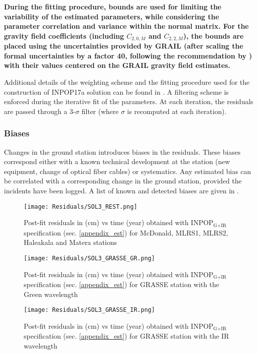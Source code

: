 \documentclass[fleqn,usenatbib,referee]{mnras}
\begin{document}
    \textbf{During the fitting procedure, bounds are used \cite[]{Stark&Parker95} for limiting the variability of the estimated parameters, while considering the parameter correlation and variance within the normal matrix. For the gravity field coefficients (including $C_{2,0,M}$ and $C_{2,2,M}$), the bounds are placed using the uncertainties provided by GRAIL (after scaling the formal uncertainties by a factor 40, following the recommendation by \cite{Konopliv2013}) with their values centered on the GRAIL gravity field estimates.}

    Additional details of the weighting scheme and the fitting procedure used for the construction of INPOP17a solution can be found in \cite{Viswanathan2017a}.
    A filtering scheme is enforced during the iterative fit of the parameters. At each iteration, the residuals are passed through a 3-$\sigma$ filter (where $\sigma$ is recomputed at each iteration).
      
    \subsubsection{Biases}
    \label{appendixB_bias}
    Changes in the ground station introduces biases in the residuals. These biases correspond either with a known technical development at the station (new equipment, change of optical fiber cables) or systematics. Any estimated bias can be correlated with a corresponding change in the ground station, provided the incidents have been logged. A list of known and detected biases are given in \cite{Viswanathan2017a}.

  \begin{figure}
    \centering
    \texttt{[image: Residuals/SOL3\_REST.png]}
    \caption{Post-fit residuals in (cm) vs time (year) obtained with INPOP$_{\textrm{G+IR}}$ specification (sec. \ref{appendix_est}) for McDonald, MLRS1, MLRS2, Haleakala and Matera stations}
    \label{fig:pf_rest} 
    \end{figure}

    \begin{figure}
    \centering
    \texttt{[image: Residuals/SOL3\_GRASSE\_GR.png]}
    \caption{Post-fit residuals in (cm) vs time (year) obtained with INPOP$_{\textrm{G+IR}}$ specification (sec. \ref{appendix_est}) for GRASSE station with the Green wavelength}
    \label{fig:pf_Calern_gr}
   \end{figure}

    \begin{figure}
    \centering
    \texttt{[image: Residuals/SOL3\_GRASSE\_IR.png]}
    \caption{Post-fit residuals in (cm) vs time (year) obtained with INPOP$_{\textrm{G+IR}}$ specification (sec. \ref{appendix_est}) for GRASSE station with the IR wavelength}
    \label{fig:pf_Calern_ir}
    \end{figure}
\end{document}
